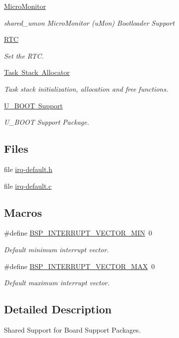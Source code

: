 \begin{DoxyCompactItemize}
\mbox{\hyperlink{group__shared__umon}{Micro\+Monitor}}
\begin{DoxyCompactList}\small\item\em shared\+\_\+umon Micro\+Monitor (u\+Mon) Bootloader Support \end{DoxyCompactList}\item 
\mbox{\hyperlink{group__shared__tod}{R\+TC}}
\begin{DoxyCompactList}\small\item\em Set the R\+TC. \end{DoxyCompactList}\item 
\mbox{\hyperlink{group__bsp__stack}{Task Stack Allocator}}
\begin{DoxyCompactList}\small\item\em Task stack initialization, allocation and free functions. \end{DoxyCompactList}\item 
\mbox{\hyperlink{group__shared__uboot}{U\+\_\+\+B\+O\+O\+T Support}}
\begin{DoxyCompactList}\small\item\em U\+\_\+\+B\+O\+OT Support Package. \end{DoxyCompactList}\end{DoxyCompactItemize}
\subsection*{Files}
\begin{DoxyCompactItemize}
\item 
file \mbox{\hyperlink{irq-default_8h}{irq-\/default.\+h}}
\item 
file \mbox{\hyperlink{irq-default_8c}{irq-\/default.\+c}}
\end{DoxyCompactItemize}
\subsection*{Macros}
\begin{DoxyCompactItemize}
\item 
\mbox{\label{group__RTEMSBSPsShared_ga64cbb02dfea4d6923abccaa0087d2a0d}} 
\#define \mbox{\hyperlink{group__RTEMSBSPsShared_ga64cbb02dfea4d6923abccaa0087d2a0d}{B\+S\+P\+\_\+\+I\+N\+T\+E\+R\+R\+U\+P\+T\+\_\+\+V\+E\+C\+T\+O\+R\+\_\+\+M\+IN}}~0
\begin{DoxyCompactList}\small\item\em Default minimum interrupt vector. \end{DoxyCompactList}\item 
\mbox{\label{group__RTEMSBSPsShared_gae4a2cdda5816a4c83c2fac0a49880c6e}} 
\#define \mbox{\hyperlink{group__RTEMSBSPsShared_gae4a2cdda5816a4c83c2fac0a49880c6e}{B\+S\+P\+\_\+\+I\+N\+T\+E\+R\+R\+U\+P\+T\+\_\+\+V\+E\+C\+T\+O\+R\+\_\+\+M\+AX}}~0
\begin{DoxyCompactList}\small\item\em Default maximum interrupt vector. \end{DoxyCompactList}\end{DoxyCompactItemize}


\subsection{Detailed Description}
Shared Support for Board Support Packages. 

